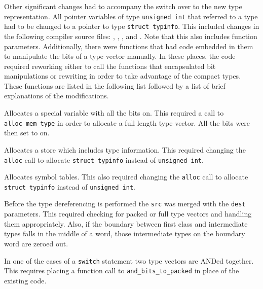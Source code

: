 Other significant changes had to accompany the switch over to the new
type representation. All pointer variables of type \texttt{unsigned
int} that referred to a type had to be changed to a pointer to type
\texttt{struct typinfo}. This included changes in the following
compiler source files: , ,
, and . Note that this also
includes function parameters. Additionally, there were functions that
had code embedded in them to manipulate the bits of a type vector
manually. In these places, the code required reworking either to
call the functions that encapsulated bit manipulations or rewriting in
order to take advantage of the compact types. These functions are
listed in the following list followed by a list of brief explanations
of the modifications.


Allocates a special variable with all the bits on. This required a
call to \texttt{alloc\_mem\_type} in order to allocate a full length
type vector. All the bits were then set to on.


Allocates a store which includes type information. This required
changing the \texttt{alloc} call to allocate \texttt{struct typinfo}
instead of \texttt{unsigned int}.


Allocates symbol tables. This also required changing the
\texttt{alloc} call to allocate \texttt{struct typinfo} instead of
\texttt{unsigned int}.


Before the type dereferencing is performed the \texttt{src} was merged
with the \texttt{dest} parameters. This required checking for packed
or full type vectors and handling them appropriately. Also, if the
boundary between first class and intermediate types falls in the
middle of a word, those intermediate types on the boundary word are
zeroed out.


In one of the cases of a \texttt{switch} statement two type vectors
are ANDed together. This requires placing a function call to
\texttt{and\_bits\_to\_packed} in place of the existing code.

